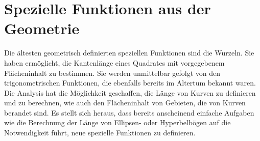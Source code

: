 %
%
%
\chapter{Spezielle Funktionen aus der Geometrie
\label{buch:chapter:geometrie}}
\rhead{}

Die ältesten geometrisch definierten speziellen Funktionen
sind die Wurzeln.
Sie haben ermöglicht, die Kantenlänge eines Quadrates mit vorgegebenem
Flächeninhalt zu bestimmen.
Sie werden unmittelbar gefolgt von den trigonometrischen Funktionen,
die ebenfalls bereits im Altertum bekannt waren.
Die Analysis hat die Möglichkeit geschaffen, die Länge von Kurven
zu definieren und zu berechnen, wie auch den Flächeninhalt von
Gebieten, die von Kurven berandet sind.
Es stellt sich heraus, dass bereits anscheinend einfache Aufgaben
wie die Berechnung der Länge von Ellipsen- oder Hyperbelbögen auf
die Notwendigkeit führt, neue spezielle Funktionen zu definieren.








